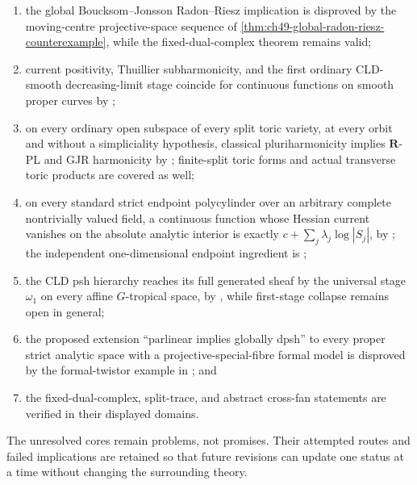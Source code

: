 \begin{enumerate}
      pseudoeffective real class, while its class-level reading is
      disproved;
\item the global Boucksom--Jonsson Radon--Riesz implication is disproved by
      the moving-centre projective-space sequence of
      \cref{thm:ch49-global-radon-riesz-counterexample}, while the
      fixed-dual-complex theorem remains valid;
\item current positivity, Thuillier subharmonicity, and the first ordinary
      CLD-smooth decreasing-limit stage coincide for continuous functions on
      smooth proper curves by
      ;
\item on every ordinary open subspace of every split toric variety, at every
      orbit and without a simpliciality hypothesis, classical
      pluriharmonicity implies \(\mathbf R\)-PL and GJR harmonicity by
      ; finite-split toric forms and
      actual transverse toric products are covered as well;
\item on every standard strict endpoint polycylinder over an arbitrary
      complete nontrivially valued field, a continuous function whose Hessian
      current vanishes on the absolute analytic interior is exactly
      \(c+\sum_j\lambda_j\log|S_j|\), by
      ; the independent
      one-dimensional endpoint ingredient is
      ;
\item the CLD psh hierarchy reaches its full generated sheaf by the universal
      stage $\omega_1$ on every affine $G$-tropical space, by
      , while first-stage collapse
      remains open in general;
\item the proposed extension ``parlinear implies globally dpsh'' to every
      proper strict analytic space with a projective-special-fibre formal
      model is disproved by the formal-twistor example in
      ; and
\item the fixed-dual-complex, split-trace, and abstract cross-fan statements
      are verified in their displayed domains.
\end{enumerate}

The unresolved cores remain problems, not promises.  Their attempted routes
and failed implications are retained so that future revisions can update one
status at a time without changing the surrounding theory.

